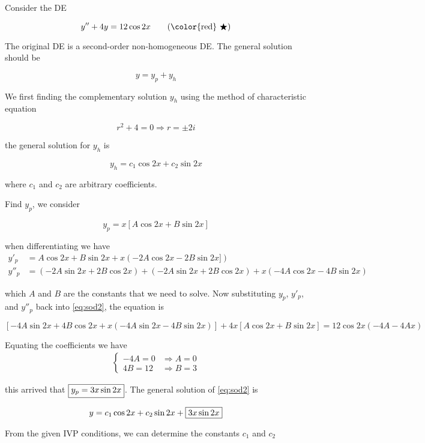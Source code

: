 \begin{solution}
    Consider the DE 

    \begin{equation*}
        y'' + 4y = 12 \cos 2x   \label{eq:sod2} \tag{{\color{red} $\bigstar$}}
    \end{equation*}

    The original DE is a second-order non-homogeneous DE. The general solution should be 

    \[
        y = y_p + y_h
    \]

    We first finding the complementary solution $y_h$ using the method of 
    characteristic equation

    \begin{equation*}
        r^2 + 4 = 0 \Rightarrow r = \pm 2i
    \end{equation*}

    the general solution for $y_h$ is 

    \begin{equation*}
        y_h = c_1 \cos 2x + c_2 \sin 2x
    \end{equation*}

    where $c_1$ and $c_2$ are arbitrary coefficients.

    Find $y_p$, we consider 

    \[
        y_p = x[A \cos 2x + B \sin 2x]
    \]

    when differentiating we have 
    \begin{align*}
        y'_p &= A \cos 2x + B \sin 2x + x(-2A \cos 2x -2B \sin 2x]) \\[0.5em]
        y''_p &= (-2A \sin 2x + 2B \cos 2x) + (-2A \sin 2x + 2B \cos 2x)
        + x(-4A \cos 2x - 4B \sin 2x)
    \end{align*}

    which $A$ and $B$ are the constants that we need to solve.
    Now substituting $y_p$, $y'_p$, and $y''_p$ back into \eqref{eq:sod2}, the equation is 

    \[
        [-4A \sin 2x + 4B \cos 2x + x(-4A \sin 2x - 4B \sin 2x)] + 4x[A \cos 2x + B\sin 2x] 
        = 12 \cos 2x
        (-4A - 4Ax)
    \]

    Equating the coefficients we have 
    \begin{align*}
        \begin{cases}
            -4A = 0 &\Rightarrow A = 0\\
        4B = 12 &\Rightarrow B = 3
        \end{cases}
    \end{align*}

    this arrived that $\fbox{$y_p = 3x \sin 2x$}$. The general solution of \eqref{eq:sod2} is 

    \begin{equation*}
        y = c_1 \cos 2x + c_2 \sin 2x + \fbox{$3x \sin 2x$}
    \end{equation*}

    From the given IVP conditions, we can determine the constants $c_1$ and $c_2$
\end{solution}

